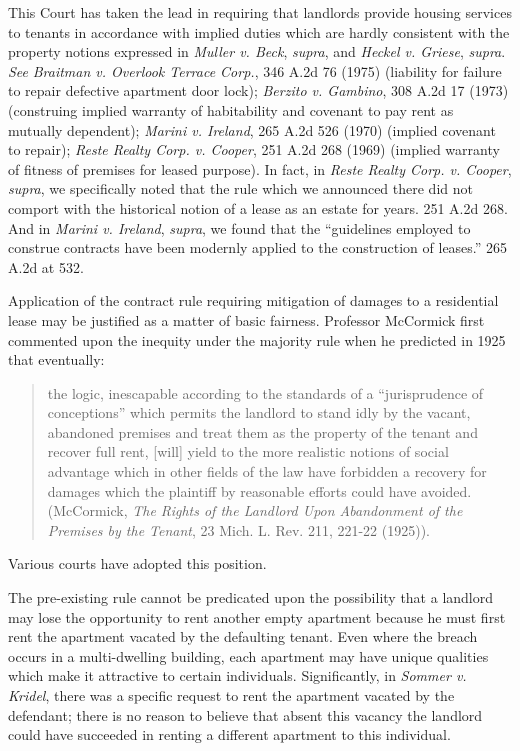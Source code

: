 This Court has taken the lead in requiring that landlords provide housing
services to tenants in accordance with implied duties which are hardly
consistent with the property notions expressed in \textit{Muller v. Beck},
\textit{supra}, and \textit{Heckel v. Griese}, \textit{supra}. \textit{See}
\textit{Braitman v. Overlook Terrace Corp.}, 346 A.2d 76 (1975) (liability for
failure to repair defective apartment door lock); \textit{Berzito v. Gambino},
308 A.2d 17 (1973) (construing implied warranty of habitability and covenant to
pay rent as mutually dependent); \textit{Marini v. Ireland}, 265 A.2d 526
(1970) (implied covenant to repair); \textit{Reste Realty Corp. v. Cooper}, 251
A.2d 268 (1969) (implied warranty of fitness of premises for leased purpose).
In fact, in \textit{Reste Realty Corp. v. Cooper}, \textit{supra}, we
specifically noted that the rule which we announced there did not comport with
the historical notion of a lease as an estate for years. 251 A.2d 268. And in
\textit{Marini v. Ireland}, \textit{supra}, we found that the ``guidelines
employed to construe contracts have been modernly applied to the construction
of leases.'' 265 A.2d at 532.

Application of the contract rule requiring mitigation of damages to a
residential lease may be justified as a matter of basic
fairness. Professor
McCormick first commented upon the inequity under the majority rule when he
predicted in 1925 that eventually:
\begin{quote}
the logic, inescapable according to the standards of a ``jurisprudence of
conceptions'' which permits the landlord to stand idly by the vacant, abandoned
premises and treat them as the property of the tenant and recover full rent,
[will] yield to the more realistic notions of social advantage which in other
fields of the law have forbidden a recovery for damages which the plaintiff by
reasonable efforts could have avoided. (McCormick, \textit{The Rights of the
Landlord Upon Abandonment of the Premises by the Tenant}, 23 Mich. L. Rev. 211,
221-22 (1925)).
\end{quote}
Various courts have adopted this position.

The pre-existing rule cannot be predicated upon the possibility that a landlord
may lose the opportunity to rent another empty apartment because he must first
rent the apartment vacated by the defaulting tenant. Even where the breach
occurs in a multi-dwelling building, each apartment may have unique qualities
which make it attractive to certain individuals. Significantly, in
\textit{Sommer v. Kridel}, there was a specific request to rent the apartment
vacated by the defendant; there is no reason to believe that absent this
vacancy the landlord could have succeeded in renting a different apartment to
this individual.

